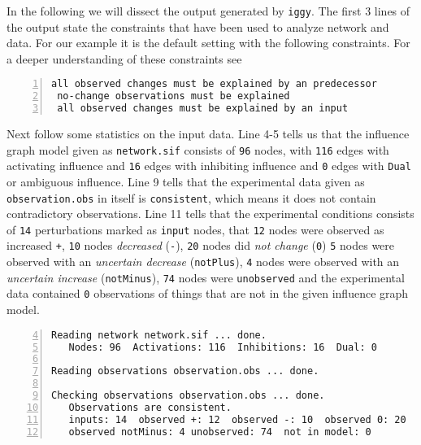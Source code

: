 \documentclass{article}
\newcommand\iggy{\texttt{iggy}}
\begin{document}
In the following we will dissect the output generated by \iggy.
The first 3 lines of the output state the constraints that have been used to analyze network and data.
For our example it is the default setting with the following constraints.
For a deeper understanding of these constraints see~\cite{sthiele15}

\begin{Verbatim}[frame=single,numbers=left]
 all observed changes must be explained by an predecessor
 no-change observations must be explained
 all observed changes must be explained by an input
\end{Verbatim}

Next follow some statistics on the input data. 
Line 4-5 tells us that the influence graph model given as \texttt{network.sif} 
consists of \texttt{96} nodes, 
with \texttt{116} edges with activating influence 
and \texttt{16} edges with inhibiting influence
and \texttt{0} edges with \texttt{Dual} or ambiguous influence.
%
Line 9 tells that the experimental data given as \texttt{observation.obs} in itself is \texttt{consistent},
which means it does not contain contradictory observations.
Line 11 tells that the experimental conditions consists of \texttt{14} perturbations marked as \texttt{input} nodes, 
that \texttt{12} nodes were observed as increased \texttt{+}, 
\texttt{10} nodes \emph{decreased} (\texttt{-}),
\texttt{20} nodes did \emph{not change} (\texttt{0})
\texttt{5} nodes were observed with an \emph{uncertain decrease} (\texttt{notPlus}),
\texttt{4} nodes were observed with an \emph{uncertain increase} (\texttt{notMinus}),
\texttt{74} nodes were \texttt{unobserved} and the experimental data contained \texttt{0} observations of things that are not in the given influence graph model.

\begin{Verbatim}[frame=single,numbers=left,firstnumber=4] 
Reading network network.sif ... done.
   Nodes: 96  Activations: 116  Inhibitions: 16  Dual: 0

Reading observations observation.obs ... done.

Checking observations observation.obs ... done.
   Observations are consistent.
   inputs: 14  observed +: 12  observed -: 10  observed 0: 20  observed notPlus: 5  
   observed notMinus: 4 unobserved: 74  not in model: 0
\end{Verbatim}
\end{document}
